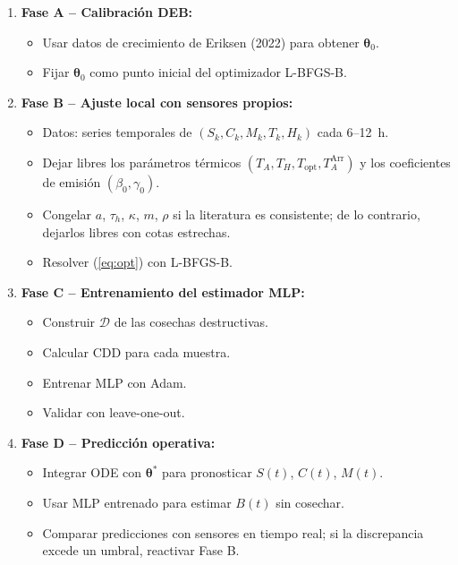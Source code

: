 \begin{enumerate}
    \item \textbf{Fase A -- Calibración DEB:}
    \begin{itemize}
        \item Usar datos de crecimiento de Eriksen (2022) para obtener $\boldsymbol{\theta}_0$.
        \item Fijar $\boldsymbol{\theta}_0$ como punto inicial del optimizador L-BFGS-B.
    \end{itemize}
    
    \item \textbf{Fase B -- Ajuste local con sensores propios:}
    \begin{itemize}
        \item Datos: series temporales de $(S_k, C_k, M_k, T_k, H_k)$ cada 6--12~h.
        \item Dejar libres los parámetros térmicos $(T_A, T_H, T_{\text{opt}}, T_A^{\text{Arr}})$ y los coeficientes de emisión $(\beta_0, \gamma_0)$.
        \item Congelar $a$, $\tau_h$, $\kappa$, $m$, $\rho$ si la literatura es consistente; de lo contrario, dejarlos libres con cotas estrechas.
        \item Resolver (\ref{eq:opt}) con L-BFGS-B.
    \end{itemize}
    
    \item \textbf{Fase C -- Entrenamiento del estimador MLP:}
    \begin{itemize}
        \item Construir $\mathcal{D}$ de las cosechas destructivas.
        \item Calcular $\mathrm{CDD}$ para cada muestra.
        \item Entrenar MLP con Adam.
        \item Validar con leave-one-out.
    \end{itemize}
    
    \item \textbf{Fase D -- Predicción operativa:}
    \begin{itemize}
        \item Integrar ODE con $\boldsymbol{\theta}^{*}$ para pronosticar $S(t)$, $C(t)$, $M(t)$.
        \item Usar MLP entrenado para estimar $B(t)$ sin cosechar.
        \item Comparar predicciones con sensores en tiempo real; si la discrepancia excede un umbral, reactivar Fase B.
    \end{itemize}
\end{enumerate}

